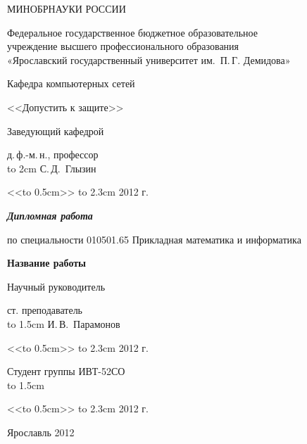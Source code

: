 \thispagestyle{empty}

\enlargethispage{2cm}
{
\renewcommand{\baselinestretch}{1.25}
\selectfont

\begin{center}
МИНОБРНАУКИ РОССИИ

Федеральное государственное бюджетное образовательное\\ учреждение
высшего профессионального образования\\
«Ярославский государственный университет им.~П.\,Г. Демидова»

Кафедра компьютерных сетей

\vspace{1.5cm}

\hfill\parbox{6.5cm}
{ 
<<Допустить к защите>>

Заведующий кафедрой

д.\,ф.-м.\,н., профессор \\
\hbox to 2cm{\hrulefill} С.\,Д.~Глызин

<<\hbox to 0.5cm{\hrulefill}>> \hbox to 2.3cm{\hrulefill} 2012 г.
}

\vspace{2.5cm}

{\bf \em Дипломная работа}
\par по специальности 010501.65 Прикладная математика и информатика



\vspace{0.5cm}

{ \large \bf \selectfont Название работы
  
}

\vspace{3cm}


\hfill\parbox{6.5cm}
{ 
Научный руководитель

ст. преподаватель\\
\hbox to 1.5cm{\hrulefill} И.\,В.~Парамонов

<<\hbox to 0.5cm{\hrulefill}>> \hbox to 2.3cm{\hrulefill} 2012 г.
}

\vspace{1.5cm}

\hfill\parbox{6.5cm}
{ 
Студент группы ИВТ-52СО\\
\hbox to 1.5cm{\hrulefill}

<<\hbox to 0.5cm{\hrulefill}>> \hbox to 2.3cm{\hrulefill} 2012 г.
}

\vspace{4cm}

Ярославль 2012
 
\end{center}
}

\newpage

